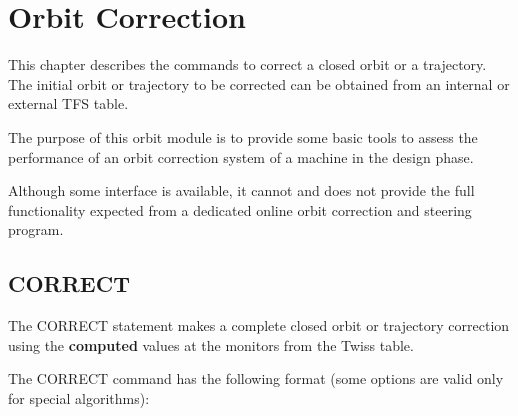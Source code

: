 
\chapter{Orbit Correction}  

This chapter describes the commands to correct a closed orbit or a
trajectory. The initial orbit or trajectory to be corrected can be
obtained  from an internal or external TFS table.   

The purpose of this orbit module is to provide some basic tools to
assess the performance of an orbit correction system of a machine in the
design phase.  

Although some interface is available, it cannot and does not provide the
full functionality expected from a dedicated online orbit correction and
steering program.  

%
\section{CORRECT}  
\label{sec:correct}

The CORRECT statement makes a complete closed orbit  or trajectory
correction using the \textbf{computed} values at the monitors  from the
Twiss table.   

The CORRECT command has the following format (some options are valid
only for special algorithms):   


